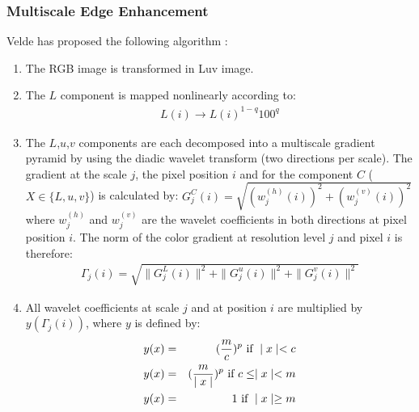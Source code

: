  
\subsubsection*{Multiscale Edge Enhancement}
Velde has proposed the following algorithm \cite{col:velde99}:
\begin{enumerate}
\item The RGB image is transformed in Luv image.
\item The $L$ component is mapped nonlinearly according to:
\begin{eqnarray}
   L(i) \rightarrow L(i)^{1-q} 100^q
\end{eqnarray}
\item The $L$,$u$,$v$ components are each decomposed into a multiscale gradient
pyramid by using the diadic wavelet transform (two directions per scale).
The gradient at the scale $j$, the pixel position $i$ and
 for the component $C$ ($X \in \{L,u,v\}$) is
calculated by: $G_j^C(i) = \sqrt{ (w_j^{(h)}(i))^2 + (w_j^{(v)}(i))^2}$ where 
$w_j^{(h)}$ and $w_j^{(v)}$ are the wavelet coefficients in both directions
at pixel position $i$. The norm of the color gradient at resolution level $j$
and pixel $i$ is therefore:
\begin{eqnarray}
\Gamma_j(i) = \sqrt{ \parallel G_j^L(i) \parallel^2 + 
                     \parallel G_j^u(i) \parallel^2 +
		     \parallel G_j^v(i) \parallel^2 }
\end{eqnarray}
\item All wavelet coefficients at scale $j$ and at position $i$ 
are multiplied by  $y(\Gamma_j(i) )$, 
where $y$ is defined by:
\begin{eqnarray}
  y(x) & = & ({m \over c})^p \mbox{ if } \mid x \mid < c \nonumber \\
  y(x) & = & ({m \over \mid x \mid })^p  \mbox{ if } c \le \mid x \mid < m \nonumber \\
  y(x) & = & 1  \mbox{ if } \mid x \mid \ge m
\end{eqnarray}

\end{enumerate}
